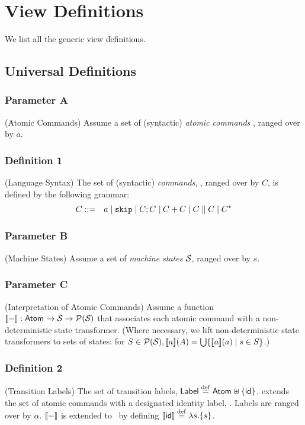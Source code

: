 \section{View Definitions}

We list all the generic view definitions\cite{conf/popl/Dinsdale-YoungBGPY13}.


\subsection{Universal Definitions}

\setcounter{secnumdepth}{0}

\subsubsection{Parameter A}(Atomic Commands)
Assume a set of (syntactic)
\emph{atomic commands} \Atom{}, ranged over by $a$.

\subsubsection{Definition 1} (Language Syntax)
The set of (syntactic) \emph{commands},
\Comm, ranged over by $C$, is defined by the following grammar:
\begin{eqnarray*}
   C &::=& a \mid \mathtt{skip} \mid C ; C \mid C+C \mid C \parallel C \mid C^*
\end{eqnarray*}

\subsubsection{Parameter B}(Machine States)
Assume a set of \emph{machine states} $\mathcal{S}_{\mathsf{}}$,
ranged over by $s$.

\subsubsection{Parameter C}(Interpretation of Atomic Commands)
Assume a function $[\![{-}]\!] : \mathsf{Atom_{}} \rightarrow \mathcal{S}_{\mathsf{}} \rightarrow \mathcal{P}(\mathcal{S}_{\mathsf{}})$
that associates each atomic
command with a non-deterministic state transformer. (Where necessary,
we lift non-deterministic state transformers to sets of states:
for $S \in \mathcal{P}(\mathcal{S}_{\mathsf{}}), [\![{a}]\!](A) = \bigcup\{[\![{a}]\!](a) \mid s \in S\}$.)


\subsubsection{Definition 2} (Transition Labels)
The set of transition labels, $\mathsf{Label} \stackrel{\mathrm{def}}{=} \mathsf{Atom_{}} \uplus \{\mathsf{id}\}$,
extends the set of atomic commands with a
designated identity label, \vid.
Labels are ranged over by $\alpha$.
$[\![{-}]\!]$ is extended to \Label\ by defining $[\![{\mathsf{id}}]\!] \stackrel{\mathrm{def}}{=} \lambda s .\{s\}$.

